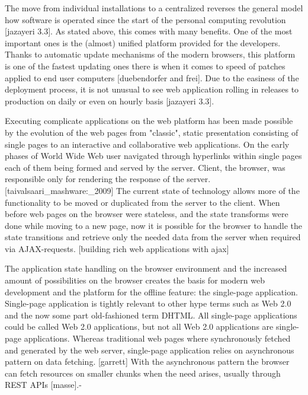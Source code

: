 The move from individual installations to a centralized reverses the general model how software is operated since the start of the personal computing revolution [jazayeri 3.3]. As stated above, this comes with many benefits. One of the most important ones is the (almost) unified platform provided for the developers. Thanks to automatic update mechanisms of the modern browsers, this platform is one of the fastest updating ones there is when it comes to speed of patches applied to end user computers [duebendorfer and frei]. Due to the easiness of the deployment process, it is not unusual to see web application rolling in releases to production on daily or even on hourly basis [jazayeri 3.3].

Executing complicate applications on the web platform has been made possible by the evolution of the web pages from "classic", static presentation consisting of single pages to an interactive and collaborative web applications. On the early phases of World Wide Web user navigated through hyperlinks within single pages each of them being formed and served by the server. Client, the browser, was responsible only for rendering the response of the server. [taivalsaari_mashware:_2009] The current state of technology allows more of the functionality to be moved or duplicated from the server to the client. When before web pages on the browser were stateless, and the state transforms were done while moving to a new page, now it is possible for the browser to handle the state transitions and retrieve only the needed data from the server when required via AJAX-requests. [building rich web applications with ajax] 

The application state handling on the browser environment and the increased amount of possibilities on the browser creates the basis for modern web development and the platform for the offline feature: the single-page application. Single-page application is tightly relevant to other hype terms such as Web 2.0 and the now some part old-fashioned term DHTML. All single-page applications could be called Web 2.0 applications, but not all Web 2.0 applications are single-page applications. Whereas traditional web pages where synchronously fetched and generated by the web server, single-page application relies on asynchronous pattern on data fetching. [garrett] With the asynchronous pattern the browser can fetch resources on smaller chunks when the need arises, usually through REST APIs [masse].-






